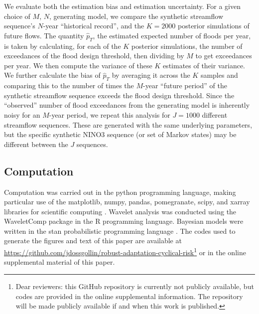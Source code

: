 \documentclass[
]{agujournal2018}
\begin{document}
We evaluate both the estimation bias and estimation uncertainty.
For a given choice of $M$, $N$, generating model, we compare the synthetic streamflow sequence's $N$-year ``historical record'', and the $K=2000$ posterior simulations of future flows.
The quantity $\hat{p}_T$, the estimated expected number of floods per year, is taken by calculating, for each of the $K$ posterior simulations, the number of exceedances of the flood design threshold, then dividing by $M$ to get exceedances per year.
We then compute the variance of these $K$ estimates of their variance.
We further calculate the bias of $\hat{p}_T$ by averaging it across the $K$ samples and comparing this to the number of times the $M$-year ``future period'' of the synthetic streamflow sequence exceeds the flood design threshold.
Since the ``observed'' number of flood exceedances from the generating model is inherently noisy for an $M$-year period, we repeat this analysis for $J=1000$ different streamflow sequences.
These are generated with the same underlying parameters, but the specific synthetic NINO3 sequence (or set of Markov states) may be different between the $J$ sequences.

\subsection{Computation}\label{sec:methods-computation}

Computation was carried out in the python programming language, making particular use of the matplotlib, numpy, pandas, pomegranate, scipy, and xarray libraries for scientific computing \citep{Hunter:2007ih, vanderWalt:2011dp, McKinney:2010un, Schreiber:2017tg, Jones:2001uv, Hoyer:2017hs}.
Wavelet analysis was conducted using the WaveletComp package \citep{Roesch:wlBQQoIs} in the R programming language.
Bayesian models were written in the stan probabilistic programming language \citep{Carpenter:2017ke}.
The codes used to generate the figures and text of this paper are available at \url{https://github.com/jdossgollin/robust-adaptation-cyclical-risk}\footnote{Dear reviewers: this GitHub repository is currently not publicly available, but codes are provided in the online supplemental information. The repository will be made publicly available if and when this work is published.} or in the online supplemental material of this paper.

\end{document}
